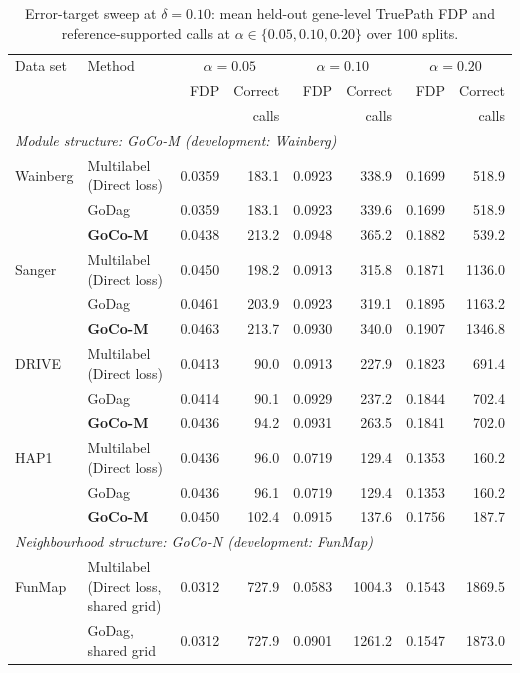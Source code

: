 \begin{table}[htbp]
\centering
\caption{Error-target sweep at $\delta=0.10$: mean held-out gene-level TruePath FDP and reference-supported calls at $\alpha\in\{0.05,0.10,0.20\}$ over 100 splits.}
\label{tab:sweep10}
\scriptsize
\begin{tabular}{ll rr rr rr}
\toprule
Data set & Method & \multicolumn{2}{c}{$\alpha=0.05$} & \multicolumn{2}{c}{$\alpha=0.10$} & \multicolumn{2}{c}{$\alpha=0.20$} \\
 & & FDP & Correct & FDP & Correct & FDP & Correct \\
 & & & calls & & calls & & calls \\ \midrule
\multicolumn{8}{l}{\emph{Module structure: GoCo-M (development: Wainberg)}} \\
Wainberg & Multilabel (Direct loss) & 0.0359 & 183.1 & 0.0923 & 338.9 & 0.1699 & 518.9 \\
 & GoDag & 0.0359 & 183.1 & 0.0923 & 339.6 & 0.1699 & 518.9 \\
 & \textbf{GoCo-M} & 0.0438 & 213.2 & 0.0948 & 365.2 & 0.1882 & 539.2 \\
\addlinespace[2pt]
Sanger & Multilabel (Direct loss) & 0.0450 & 198.2 & 0.0913 & 315.8 & 0.1871 & 1136.0 \\
 & GoDag & 0.0461 & 203.9 & 0.0923 & 319.1 & 0.1895 & 1163.2 \\
 & \textbf{GoCo-M} & 0.0463 & 213.7 & 0.0930 & 340.0 & 0.1907 & 1346.8 \\
\addlinespace[2pt]
DRIVE & Multilabel (Direct loss) & 0.0413 & 90.0 & 0.0913 & 227.9 & 0.1823 & 691.4 \\
 & GoDag & 0.0414 & 90.1 & 0.0929 & 237.2 & 0.1844 & 702.4 \\
 & \textbf{GoCo-M} & 0.0436 & 94.2 & 0.0931 & 263.5 & 0.1841 & 702.0 \\
\addlinespace[2pt]
HAP1 & Multilabel (Direct loss) & 0.0436 & 96.0 & 0.0719 & 129.4 & 0.1353 & 160.2 \\
 & GoDag & 0.0436 & 96.1 & 0.0719 & 129.4 & 0.1353 & 160.2 \\
 & \textbf{GoCo-M} & 0.0450 & 102.4 & 0.0915 & 137.6 & 0.1756 & 187.7 \\
\midrule
\multicolumn{8}{l}{\emph{Neighbourhood structure: GoCo-N (development: FunMap)}} \\
FunMap & Multilabel (Direct loss, shared grid) & 0.0312 & 727.9 & 0.0583 & 1004.3 & 0.1543 & 1869.5 \\
 & GoDag, shared grid & 0.0312 & 727.9 & 0.0901 & 1261.2 & 0.1547 & 1873.0 \\

\end{tabular}
\end{table}
